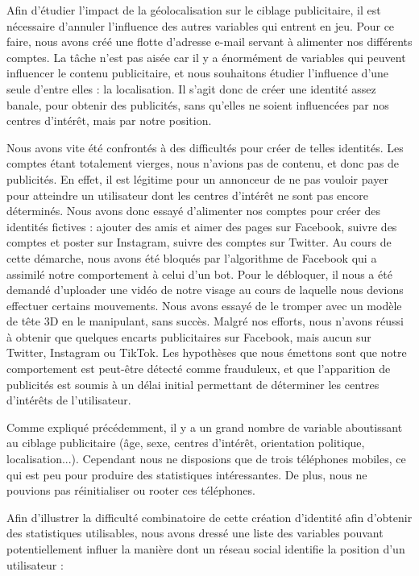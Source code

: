 \documentclass[runningheads]{llncs}
\begin{document}
Afin d'étudier l'impact de la géolocalisation sur le ciblage publicitaire, il est nécessaire d'annuler l'influence des autres variables qui entrent en jeu. Pour ce faire, nous avons créé une flotte d'adresse e-mail servant à alimenter nos différents comptes. La tâche n'est pas aisée car il y a énormément de variables qui peuvent influencer le contenu publicitaire, et nous souhaitons étudier l'influence d'une seule d'entre elles : la localisation. Il s'agit donc de créer une identité assez banale, pour obtenir des publicités, sans qu'elles ne soient influencées par nos centres d'intérêt, mais par notre position.

Nous avons vite été confrontés à des difficultés pour créer de telles identités. Les comptes étant totalement vierges, nous n'avions pas de contenu, et donc pas de publicités. En effet, il est légitime pour un annonceur de ne pas vouloir payer pour atteindre un utilisateur dont les centres d'intérêt ne sont pas encore déterminés. Nous avons donc essayé d'alimenter nos comptes pour créer des identités fictives : ajouter des amis et aimer des pages sur Facebook, suivre des comptes et poster sur Instagram, suivre des comptes sur Twitter. Au cours de cette démarche, nous avons été bloqués par l'algorithme de Facebook qui a assimilé notre comportement à celui d'un bot. Pour le débloquer, il nous a été demandé d'uploader une vidéo de notre visage au cours de laquelle nous devions effectuer certains mouvements. Nous avons essayé de le tromper avec un modèle de tête 3D en le manipulant, sans succès. Malgré nos efforts, nous n'avons réussi à obtenir que quelques encarts publicitaires sur Facebook, mais aucun sur Twitter, Instagram ou TikTok. Les hypothèses que nous émettons sont que notre comportement est peut-être détecté comme frauduleux, et que l'apparition de publicités est soumis à un délai initial permettant de déterminer les centres d'intérêts de l'utilisateur.

Comme expliqué précédemment, il y a un grand nombre de variable aboutissant au ciblage publicitaire (âge, sexe, centres d'intérêt, orientation politique, localisation...). Cependant nous ne disposions que de trois téléphones mobiles, ce qui est peu pour produire des statistiques intéressantes. De plus, nous ne pouvions pas réinitialiser ou rooter ces téléphones. 

Afin d'illustrer la difficulté combinatoire de cette création d'identité afin d'obtenir des statistiques utilisables, nous avons dressé une liste des variables pouvant potentiellement influer la manière dont un réseau social identifie la position d'un utilisateur : 
\end{document}
